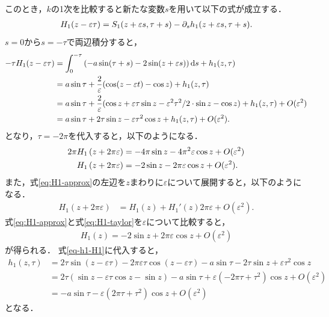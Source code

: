 \documentclass[../main]{subfiles}
\begin{document}
    このとき，$k$の1次を比較すると新たな変数$s$を用いて以下の式が成立する．
    \begin{align}
        H_1(z-\varepsilon \tau)=S_1(z+\varepsilon s,\tau+s)-\partial_s h_1(z+\varepsilon s,\tau+s).
    \end{align}
    $s=0$から$s=-\tau$で両辺積分すると，
    \begin{align}
        -\tau H_1(z-\varepsilon \tau)&=\int_0^{-\tau}\left(-a\sin(\tau+s)-2\sin(z+\varepsilon s)\right)\dd{s}+h_1(z,\tau)\notag \\
        &=a \sin\tau+\frac{2}{\varepsilon}(\cos (z-\varepsilon t)-\cos  z)+h_1(z,\tau)\notag\\
        &=a \sin\tau+\frac{2}{\varepsilon}(\cos z+\varepsilon \tau\sin z-\varepsilon^2\tau^2/2\cdot\sin z-\cos z)+h_1(z,\tau)+O(\varepsilon^2)\notag\\
        &=a \sin\tau+2\tau\sin z-\varepsilon \tau^2\cos z+h_1(z,\tau)+O(\varepsilon^2).
        \label{eq-h1-H1}
    \end{align}
    となり，$\tau=-2\pi$を代入すると，以下のようになる．
    \begin{align}
        2\pi H_1\left(z+ 2\pi\varepsilon\right)&=-4\pi\sin z-4\pi^2\varepsilon \cos z+O(\varepsilon^2)\notag\\
        H_1\left(z+2\pi\varepsilon\right)&=-2 \sin z-2\pi\varepsilon \cos z+O(\varepsilon^2).\label{eq:H1-approx}
    \end{align}
    また，式\eqref{eq:H1-approx}の左辺を$z$まわりに$\varepsilon$について展開すると，以下のようになる．
    \begin{align}
        H_1\left(z+2\pi\varepsilon\right)&=H_1(z)+H_1'(z) 2\pi\varepsilon+O(\varepsilon^2).
        \label{eq:H1-taylor}
    \end{align}
    式\eqref{eq:H1-approx}と式\eqref{eq:H1-taylor}を$\varepsilon$について比較すると，
    \begin{align}
        \label{eq:nit-H1}
        H_1(z)=-2\sin z+2\pi\varepsilon \cos z+O(\varepsilon^2)
    \end{align}
    が得られる．
    式\eqref{eq-h1-H1}に代入すると，
    \begin{align*}
        h_1(z,\tau)&=2\tau\sin(z-\varepsilon \tau)-2\pi\varepsilon \tau\cos(z-\varepsilon \tau)-a\sin\tau-2\tau\sin z+\varepsilon \tau^2\cos z\\
        &=2\tau(\sin z-\varepsilon \tau\cos z-\sin z)-a\sin\tau+\varepsilon(-2\pi \tau+\tau^2)\cos z+O(\varepsilon^2)\\
        &=-a\sin\tau-\varepsilon(2\pi \tau+\tau^2)\cos z+O(\varepsilon^2)
    \end{align*}
    となる．
\end{document}
